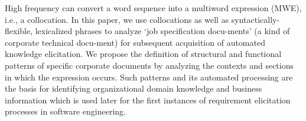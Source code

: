 High frequency can convert a word sequence into a multiword expression (MWE), i.e., a collocation. In this paper, we use collocations as well as
 syntactically-flexible, lexicalized phrases to analyze ‘job specification
 docu-ments' (a kind of corporate technical docu-ment) for subsequent
 acquisition of automated knowledge elicitation. We propose the definition of
 structural and functional patterns of specific corporate documents by analyzing
 the contexts and sections in which the expression occurs. Such patterns and its
 automated processing are the basis for identifying organizational domain
 knowledge and business information which is used later for the first instances
 of requirement elicitation processes in software engineering.

